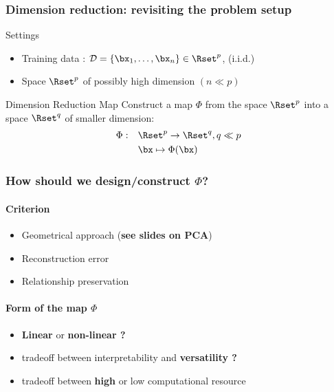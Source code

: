 \documentclass{beamer}\usepackage[]{graphicx}\usepackage[]{color}
\begin{document}
\begin{frame}
  \frametitle{Dimension reduction: revisiting the problem setup}

    \begin{block}{Settings}
      \begin{itemize}
        \item \alert{Training data} : $\mathcal{D}=\{\bx_1,\ldots,\bx_n\} \in \Rset^p$,   (i.i.d.)
        \item Space $\Rset^p$ of possibly high dimension $(n \ll p)$
      \end{itemize}
    \end{block}

    \vfill
    
    \begin{block}{Dimension Reduction Map}
       Construct a map $\Phi$ from the space $\Rset^{p}$ into a space $\Rset^{q}$ of \alert{smaller dimension}:
      \begin{align*}
          \Phi:\quad & \Rset^p \to \Rset^{q}, q \ll p\\
                     & \bx \mapsto \Phi(\bx)
      \end{align*}
    \end{block}
    
\end{frame}

\begin{frame}
  \frametitle{How should we design/construct $\Phi$?}

  \paragraph{Criterion}
  \begin{itemize}
    \item Geometrical approach (\alert{\bf see slides on PCA})
    \item Reconstruction error
    \item Relationship preservation
  \end{itemize}

  \vfill
  
  \paragraph{Form of the map $\Phi$}
  \begin{itemize}
    \item \alert{\bf Linear} or \alert{\bf non-linear ?}
    \item tradeoff between  interpretability and \alert{\bf versatility ?}
    \item tradeoff between  \alert{\bf high} or low computational resource
  \end{itemize}

\end{frame}
\end{document}
